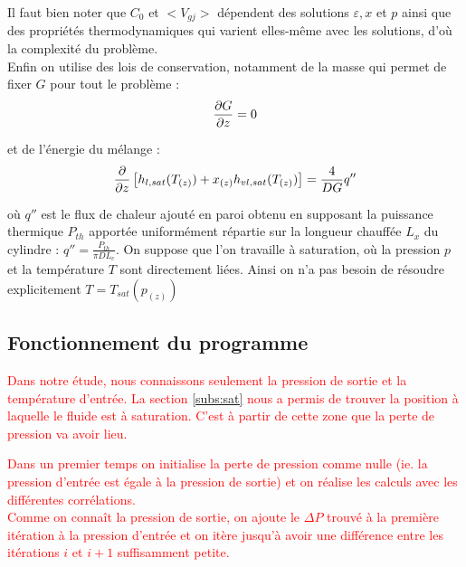 Il faut bien noter que $C_0$ et $<V_{gj}>$ dépendent des solutions $\varepsilon,x$ et $p$ ainsi que des propriétés thermodynamiques qui varient elles-même avec les solutions, d'où la complexité du problème.\\ 

Enfin on utilise des lois de conservation, notamment de la masse qui permet de fixer $G$ pour tout le problème :
\begin{equation}
    \pder[G]{z} = 0
\end{equation}

et de l'énergie du mélange :
\begin{equation}
    \pder{z} \left[ h_{l,sat}(T_{(z)})+x_{(z)}h_{vl,sat}(T_{(z)})\right] = \frac{4}{DG}q''
\label{eq:titre}
\end{equation}

où $q''$ est le flux de chaleur ajouté en paroi obtenu en supposant la puissance thermique $P_{th}$ apportée uniformément répartie sur la longueur chauffée $L_x$ du cylindre : $q'' = \frac{P_{th}}{\pi DL_c}$. On suppose que l'on travaille à saturation, où la pression $p$ et la température $T$ sont directement liées. Ainsi on n'a pas besoin de résoudre explicitement $T = T_{sat}(p_{(z)})$\\ \par


\subsection{Fonctionnement du programme}
\textcolor{red}{Dans notre étude, nous connaissons seulement la pression de sortie et la température d'entrée. La section \ref{subs:sat} nous a permis de trouver la position à laquelle le fluide est à saturation. C'est à partir de cette zone que la perte de pression va avoir lieu.} \\ \par
\textcolor{red}{Dans un premier temps on initialise la perte de pression comme nulle (ie. la pression d'entrée est égale à la pression de sortie) et on réalise les calculs avec les différentes corrélations.} \\
\textcolor{red}{Comme on connaît la pression de sortie, on ajoute le $\Delta P$ trouvé à la première itération à la pression d'entrée et on itère jusqu'à avoir une différence entre les itérations $i$ et $i+1$ suffisamment petite.}